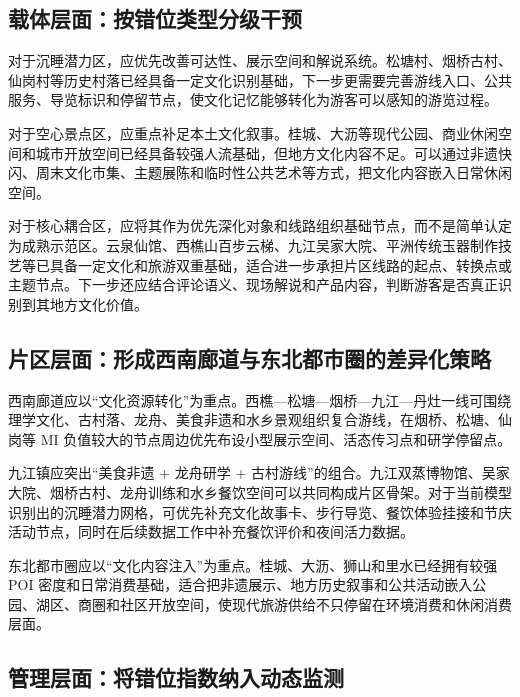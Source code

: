 \subsection{载体层面：按错位类型分级干预}\label{ux8f7dux4f53ux5c42ux9762ux6309ux9519ux4f4dux7c7bux578bux5206ux7ea7ux5e72ux9884}

对于沉睡潜力区，应优先改善可达性、展示空间和解说系统。松塘村、烟桥古村、仙岗村等历史村落已经具备一定文化识别基础，下一步更需要完善游线入口、公共服务、导览标识和停留节点，使文化记忆能够转化为游客可以感知的游览过程。

对于空心景点区，应重点补足本土文化叙事。桂城、大沥等现代公园、商业休闲空间和城市开放空间已经具备较强人流基础，但地方文化内容不足。可以通过非遗快闪、周末文化市集、主题展陈和临时性公共艺术等方式，把文化内容嵌入日常休闲空间。

对于核心耦合区，应将其作为优先深化对象和线路组织基础节点，而不是简单认定为成熟示范区。云泉仙馆、西樵山百步云梯、九江吴家大院、平洲传统玉器制作技艺等已具备一定文化和旅游双重基础，适合进一步承担片区线路的起点、转换点或主题节点。下一步还应结合评论语义、现场解说和产品内容，判断游客是否真正识别到其地方文化价值。

\subsection{片区层面：形成西南廊道与东北都市圈的差异化策略}\label{ux7247ux533aux5c42ux9762ux5f62ux6210ux897fux5357ux5ecaux9053ux4e0eux4e1cux5317ux90fdux5e02ux5708ux7684ux5deeux5f02ux5316ux7b56ux7565}

西南廊道应以``文化资源转化''为重点。西樵---松塘---烟桥---九江---丹灶一线可围绕理学文化、古村落、龙舟、美食非遗和水乡景观组织复合游线，在烟桥、松塘、仙岗等 MI 负值较大的节点周边优先布设小型展示空间、活态传习点和研学停留点。

九江镇应突出``美食非遗 + 龙舟研学 + 古村游线''的组合。九江双蒸博物馆、吴家大院、烟桥古村、龙舟训练和水乡餐饮空间可以共同构成片区骨架。对于当前模型识别出的沉睡潜力网格，可优先补充文化故事卡、步行导览、餐饮体验挂接和节庆活动节点，同时在后续数据工作中补充餐饮评价和夜间活力数据。

东北都市圈应以``文化内容注入''为重点。桂城、大沥、狮山和里水已经拥有较强 POI 密度和日常消费基础，适合把非遗展示、地方历史叙事和公共活动嵌入公园、湖区、商圈和社区开放空间，使现代旅游供给不只停留在环境消费和休闲消费层面。

\subsection{管理层面：将错位指数纳入动态监测}\label{ux7ba1ux7406ux5c42ux9762ux5c06ux9519ux4f4dux6307ux6570ux7eb3ux5165ux52a8ux6001ux76d1ux6d4b}

